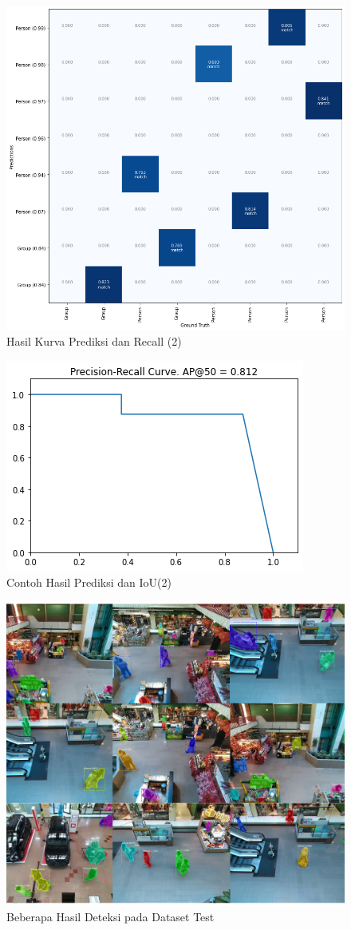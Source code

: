 \begin{figure}[h!]
  \begin{center}
    \includegraphics[width= 0.7\linewidth]{bab4/Contoh Hasil prediksi 3.6.png}
    \caption{Hasil Kurva Prediksi dan Recall (2)}
    \label{fig: Predictions 2.6}
  \end{center}
\end{figure}

\begin{figure}[h!]
  \begin{center}
    \includegraphics[width= 0.7\linewidth]{bab4/Contoh Hasil prediksi 3.5.png}
    \caption{Contoh Hasil Prediksi dan IoU(2)}
    \label{fig: Predictions 2.5}
  \end{center}
\end{figure}

\begin{figure}[h!]
  \begin{center}
    \includegraphics[width= 0.55\linewidth]{bab4/Hasil Test.png}
    \caption{Beberapa Hasil Deteksi pada Dataset Test}
    \label{fig: Test Dataset Result}
  \end{center}
\end{figure}

